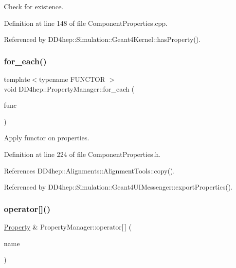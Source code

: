 Check for existence. 



Definition at line 148 of file Component\+Properties.\+cpp.



Referenced by D\+D4hep\+::\+Simulation\+::\+Geant4\+Kernel\+::has\+Property().

\hypertarget{class_d_d4hep_1_1_property_manager_ab13bf51cccabd287b45efc2f8b7584d2}{}\label{class_d_d4hep_1_1_property_manager_ab13bf51cccabd287b45efc2f8b7584d2} 
\subsubsection{\texorpdfstring{for\+\_\+each()}{for\_each()}}
{\footnotesize\ttfamily template$<$typename F\+U\+N\+C\+T\+OR $>$ \\
void D\+D4hep\+::\+Property\+Manager\+::for\+\_\+each (\begin{DoxyParamCaption}\item[{F\+U\+N\+C\+T\+OR \&}]{func }\end{DoxyParamCaption})\hspace{0.3cm}{\ttfamily [inline]}}



Apply functor on properties. 



Definition at line 224 of file Component\+Properties.\+h.



References D\+D4hep\+::\+Alignments\+::\+Alignment\+Tools\+::copy().



Referenced by D\+D4hep\+::\+Simulation\+::\+Geant4\+U\+I\+Messenger\+::export\+Properties().

\hypertarget{class_d_d4hep_1_1_property_manager_a42780898d22a908befe48f8137f7321e}{}\label{class_d_d4hep_1_1_property_manager_a42780898d22a908befe48f8137f7321e} 
\subsubsection{\texorpdfstring{operator[]()}{operator[]()}\hspace{0.1cm}{\footnotesize\ttfamily [1/2]}}
{\footnotesize\ttfamily \hyperlink{class_d_d4hep_1_1_property}{Property} \& Property\+Manager\+::operator\mbox{[}$\,$\mbox{]} (\begin{DoxyParamCaption}\item[{const std\+::string \&}]{name }\end{DoxyParamCaption})}



